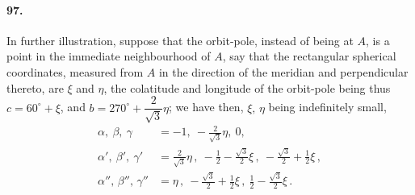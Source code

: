 \documentclass[11pt]{article}
\begin{document}
\paragraph{97.} In further illustration, suppose that the orbit-pole, instead of being at $A$, is a point in the immediate neighbourhood of $A$, say that the rectangular spherical coordinates, measured from $A$ in the direction of the meridian and perpendicular thereto, are $\xi$ and $\eta$, the colatitude and longitude of the orbit-pole being thus $c = 60^{\circ} + \xi$, and $b = 270^{\circ} + \dfrac{2}{\sqrt{3}}\eta$; we have then, $\xi,\, \eta$ being indefinitely small,
\[
\begin{aligned}
\alpha,\ \beta,\ \gamma &= -1,\ -\tfrac{2}{\sqrt{3}}\eta,\ 0,\\
\alpha',\ \beta',\ \gamma' &= \tfrac{2}{\sqrt{3}}\eta\,,\ -\tfrac{1}{2} - \tfrac{\sqrt{3}}{2}\xi\,,\ -\tfrac{\sqrt{3}}{2} + \tfrac{1}{2}\xi\,,\\
\alpha'',\, \beta'',\, \gamma'' &= \eta\,,\ -\tfrac{\sqrt{3}}{2} + \tfrac{1}{2}\xi\,,\ \tfrac{1}{2} - \tfrac{\sqrt{3}}{2}\xi\,.
\end{aligned}
\]
\end{document}
